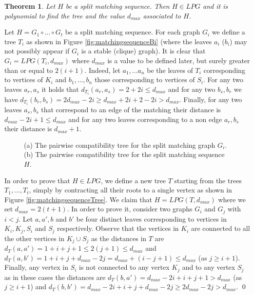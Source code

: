\documentclass[dvipdfm]{llncs}
\newtheorem{Theorem}{Theorem}
\newcommand{\dmax}{d_{max}}
\begin{document}
\begin{Theorem}\label{theo:matchingSequence}
Let $H$ be a split matching sequence. Then $H \in LPG$ and it is polynomial to find the tree and the value $\dmax$ associated to $H$.
\end{Theorem}
\proof
Let $H= G_1 \circ \ldots \circ G_t$ be a  split matching sequence. For each graph $G_i$ we define a tree $T_i$ as shown in Figure \ref{fig:matchingsequenceBi} (where the leaves $a_i$ ($b_i$) may not possibly appear if $G_i$ is a stable (clique) graph). It is clear that $G_i=LPG(T_i, \dmax)$ where $\dmax$ is a value to be defined later, but surely greater than or equal to $2(i+1)$. Indeed, let $a_1, \ldots a_n$ be the leaves of $T_i$ corresponding to vertices of $K_i$ and $b_1, \ldots, b_n$ those corresponding to vertices of $S_i$. For any two leaves $a_r, a_s$ it holds that $d_{T_i}(a_r,a_s)=2+2i\leq \dmax$ and for any two $b_s, b_r$ we have $d_{T_i}(b_r,b_s)=2 \dmax-2i \geq \dmax +2i+2-2i > \dmax$. Finally, for any two leaves $a_s, b_s$ that correspond to an edge of the matching their distance is $\dmax-2i+1 \leq \dmax$ and for any two leaves corresponding to a non edge $a_r, b_s$ their distance is $\dmax +1$. 

\begin{figure}[!ht]
  \begin{center}
  \end{center}
\caption{\footnotesize{(a) The pairwise compatibility tree for the split matching graph $G_i$.  (b) The pairwise compatibility tree for the split matching sequence $H$. }}
\label{fig:matchingsequence}
\end{figure}


In order to prove that $H \in LPG$,  we define a new tree $T$ starting from the trees $T_1, \ldots, T_t$, simply by contracting all their roots to a single vertex as shown in Figure \ref{fig:matchingsequenceTree}. We claim that $H=LPG(T, \dmax)$ where we set $\dmax = 2(t+1)$. In order to prove it, consider two graphs $G_i$ and $G_j$ with $i < j$. Let  $a, a', b$ and $b'$ be four distinct leaves  corresponding to vertices in $K_i, K_j, S_i$ and $S_j$ respectively. 
Observe that the vertices in $K_i$ are connected to all the other vertices in $K_j \cup S_j$ as the distances in $T$ are $d_T(a,a') = 1+ i+j+1 \leq 2(j+1) \leq \dmax$ and $d_T(a,b') = 1+i+j+\dmax-2j= \dmax +(i-j+1) \leq \dmax$ (as $j \geq i+1$). Finally, any vertex in $S_i$ is not connected to any vertex $K_j$ and to any vertex $S_j$ as in these cases the distances are $d_T(b,a') = \dmax-2i+i+j+1>\dmax$ (as $j \geq i+1$) and $d_T(b,b') =\dmax-2i+i+j+\dmax-2j \geq 2\dmax-2j >\dmax$. \qed
\end{document}
